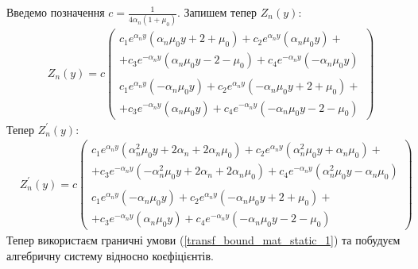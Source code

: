 Введемо позначення $c = \frac{1}{4\alpha_n (1 + \mu_0)}$. \newline
Запишем тепер $Z_n(y)$:
\begin{align*}
    &Z_n(y) = c
    \begin{pmatrix}
        c_1 e^{\alpha_n y} (\alpha_n \mu_0 y + 2 + \mu_0) + c_2 e^{\alpha_n y} (\alpha_n \mu_0 y) + 
        \\ + c_3 e^{-\alpha_n y} (\alpha_n \mu_0 y - 2 - \mu_0) + c_4 e^{-\alpha_n y} (-\alpha_n \mu_0 y) \\
        \\
        c_1 e^{\alpha_n y} (-\alpha_n \mu_0 y) + c_2 e^{\alpha_n y} (-\alpha_n \mu_0 y + 2 + \mu_0) + 
        \\ + c_3 e^{-\alpha_n y} (\alpha_n \mu_0 y) + c_4 e^{-\alpha_n y} (-\alpha_n \mu_0 y - 2 - \mu_0)
    \end{pmatrix}
\end{align*}
Тепер $Z_n^{'}(y)$:
\begin{align*}
    &Z_n^{'}(y) = c
    \begin{pmatrix}
        c_1 e^{\alpha_n y} (\alpha_n^2 \mu_0 y + 2 \alpha_n + 2 \alpha_n \mu_0) + c_2 e^{\alpha_n y} (\alpha_n^2 \mu_0 y + \alpha_n \mu_0) + 
        \\ + c_3 e^{-\alpha_n y} (-\alpha_n^2 \mu_0 y + 2 \alpha_n + 2 \alpha_n \mu_0) + c_4 e^{-\alpha_n y} (\alpha_n^2 \mu_0 y - \alpha_n \mu_0) \\
        \\
        c_1 e^{\alpha_n y} (-\alpha_n \mu_0 y) + c_2 e^{\alpha_n y} (-\alpha_n \mu_0 y + 2 + \mu_0) + 
        \\ + c_3 e^{-\alpha_n y} (\alpha_n \mu_0 y) + c_4 e^{-\alpha_n y} (-\alpha_n \mu_0 y - 2 - \mu_0)
    \end{pmatrix}
\end{align*}
Тепер використаєм граничні умови (\ref{transf_bound_mat_static_1}) та побудуєм алгебричну систему відносно коєфіцієнтів.


